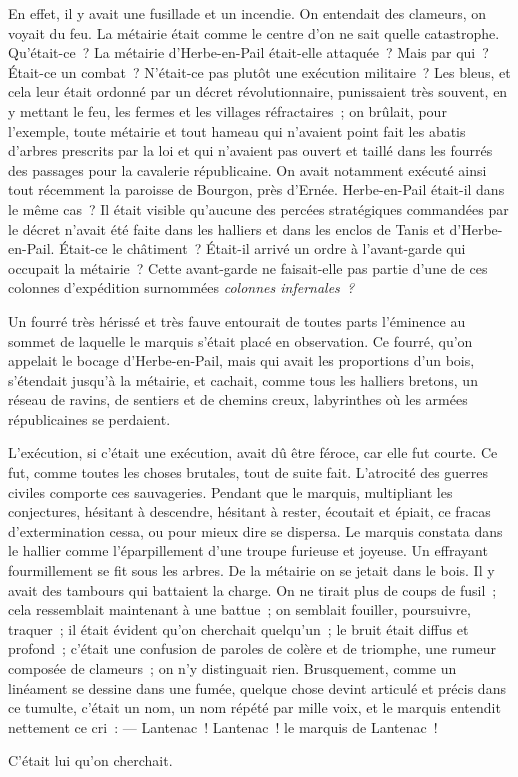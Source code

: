 \documentclass[french,twoside]{book} %
\begin{document}
En effet, il y avait une fusillade et un incendie. On entendait des clameurs, on voyait du feu. La métairie était comme le centre d’on ne sait quelle catastrophe. Qu’était-ce ? La métairie d’Herbe-en-Pail était-elle  attaquée ? Mais par qui ? Était-ce un combat ? N’était-ce pas plutôt une exécution militaire ? Les bleus, et cela leur était ordonné par un décret révolutionnaire, punissaient très souvent, en y mettant le feu, les fermes et les villages réfractaires ; on brûlait, pour l’exemple, toute métairie et tout hameau qui n’avaient point fait les abatis d’arbres prescrits par la loi et qui n’avaient pas ouvert et taillé dans les fourrés des passages pour la cavalerie républicaine. On avait notamment exécuté ainsi tout récemment la paroisse de Bourgon, près d’Ernée. Herbe-en-Pail était-il dans le même cas ? Il était visible qu’aucune des percées stratégiques commandées par le décret n’avait été faite dans les halliers et dans les enclos de Tanis et d’Herbe-en-Pail. Était-ce le châtiment ? Était-il arrivé un ordre à l’avant-garde qui occupait la métairie ? Cette avant-garde ne faisait-elle pas partie d’une de ces colonnes d’expédition surnommées \emph{colonnes infernales ?}\par
Un fourré très hérissé et très fauve entourait de toutes parts l’éminence au sommet de laquelle le marquis s’était placé en observation. Ce fourré, qu’on appelait le bocage d’Herbe-en-Pail, mais qui avait les proportions d’un bois, s’étendait jusqu’à la métairie, et cachait, comme tous les halliers bretons, un réseau de ravins, de sentiers et de chemins creux, labyrinthes où les armées républicaines se perdaient.\par
L’exécution, si c’était une exécution, avait dû être féroce, car elle fut courte. Ce fut, comme toutes les choses brutales, tout de suite fait. L’atrocité des guerres civiles comporte ces sauvageries. Pendant que  le marquis, multipliant les conjectures, hésitant à descendre, hésitant à rester, écoutait et épiait, ce fracas d’extermination cessa, ou pour mieux dire se dispersa. Le marquis constata dans le hallier comme l’éparpillement d’une troupe furieuse et joyeuse. Un effrayant fourmillement se fit sous les arbres. De la métairie on se jetait dans le bois. Il y avait des tambours qui battaient la charge. On ne tirait plus de coups de fusil ; cela ressemblait maintenant à une battue ; on semblait fouiller, poursuivre, traquer ; il était évident qu’on cherchait quelqu’un ; le bruit était diffus et profond ; c’était une confusion de paroles de colère et de triomphe, une rumeur composée de clameurs ; on n’y distinguait rien. Brusquement, comme un linéament se dessine dans une fumée, quelque chose devint articulé et précis dans ce tumulte, c’était un nom, un nom répété par mille voix, et le marquis entendit nettement ce cri : — Lantenac ! Lantenac ! le marquis de Lantenac !\par
C’était lui qu’on cherchait.
\end{document}
